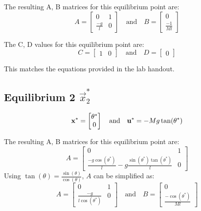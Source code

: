 \documentclass[10pt]{article}
\begin{document}
The resulting A, B matrices for this equilibrium point are:
\begin{equation*}
        A = 
        \begin{bmatrix}
        0 &1 \\ \frac{-g}{l} & 0
        \end{bmatrix}
        \quad
        \text{and}
        \quad
        B = 
        \begin{bmatrix}
        0\\ \frac{-1}{Ml}
        \end{bmatrix}
\end{equation*}

The C, D values for this equilibrium point are:
\begin{equation*}
    C = 
        \begin{bmatrix}
        1 & 0
        \end{bmatrix}
        \quad
        \text{and}
        \quad
        D = 
        \begin{bmatrix}
        0
        \end{bmatrix}
\end{equation*}

This matches the equations provided in the lab handout.
\subsection{Equilibrium 2 $\vec{x}_2^*$}
\begin{equation*}
        \mathbf{x}^* =
     \begin{bmatrix} \theta^* \\ 0 \end{bmatrix}
     \quad
     \text{and}
     \quad
     \mathbf{u}^* = -Mg\tan(\theta^*) 
\end{equation*}

The resulting A, B matrices for this equilibrium point are:
\begin{equation*}
        A = 
        \begin{bmatrix}
        0 &1 \\ \frac{-g\cos(\theta^*)}{l} - g \frac{\sin(\theta^*) \tan(\theta^*)}{l} & 0
        \end{bmatrix}
\end{equation*}
Using $\tan(\theta) = \frac{\sin(\theta)}{\cos(\theta)}$, $A$ can be simplified as:
\begin{equation*}
        A =
        \begin{bmatrix}
        0 &1 \\ \frac{-g}{l\cos(\theta^*)} & 0
        \end{bmatrix}
        \quad
        \text{and}
        \quad
        B = 
        \begin{bmatrix}
            0\\ \frac{-\cos(\theta^*)}{Ml}
        \end{bmatrix}
\end{equation*}
\end{document}
